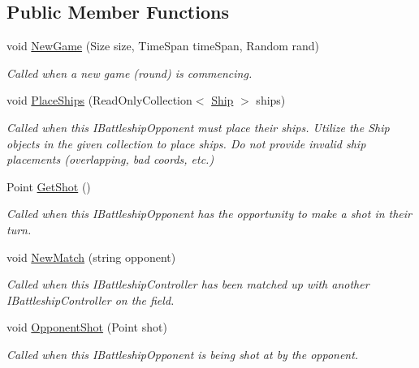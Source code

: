 \subsection*{Public Member Functions}
\begin{DoxyCompactItemize}
\item 
void \hyperlink{class_m_b_c_1_1_controllers_1_1_random_bot_af9e514b31d63c13e2d81605e3484af26}{New\-Game} (Size size, Time\-Span time\-Span, Random rand)
\begin{DoxyCompactList}\small\item\em Called when a new game (round) is commencing.\end{DoxyCompactList}\item 
void \hyperlink{class_m_b_c_1_1_controllers_1_1_random_bot_ac0605649e030bbd7d70d50d2764c14f8}{Place\-Ships} (Read\-Only\-Collection$<$ \hyperlink{class_m_b_c_1_1_core_1_1_ship}{Ship} $>$ ships)
\begin{DoxyCompactList}\small\item\em Called when this I\-Battleship\-Opponent must place their ships. Utilize the Ship objects in the given collection to place ships. Do not provide invalid ship placements (overlapping, bad coords, etc.)\end{DoxyCompactList}\item 
Point \hyperlink{class_m_b_c_1_1_controllers_1_1_random_bot_a6913b193a39e760dbb0372f9f7f530db}{Get\-Shot} ()
\begin{DoxyCompactList}\small\item\em Called when this I\-Battleship\-Opponent has the opportunity to make a shot in their turn.\end{DoxyCompactList}\item 
void \hyperlink{class_m_b_c_1_1_controllers_1_1_random_bot_a73005313c7c4aa407eb62c785ea33f30}{New\-Match} (string opponent)
\begin{DoxyCompactList}\small\item\em Called when this I\-Battleship\-Controller has been matched up with another I\-Battleship\-Controller on the field.\end{DoxyCompactList}\item 
void \hyperlink{class_m_b_c_1_1_controllers_1_1_random_bot_acc20322c0e64b17dc830c7dd605a1b0f}{Opponent\-Shot} (Point shot)
\begin{DoxyCompactList}\small\item\em Called when this I\-Battleship\-Opponent is being shot at by the opponent.\end{DoxyCompactList}\item 

\end{DoxyCompactItemize}
